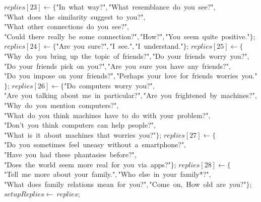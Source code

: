 \documentclass[a4paper,10pt]{article}
\begin{document}
\begin{algorithm}
\begin{algorithmic}[5]
  \STATE \(replies[23]\gets\{\)"{}In\ what\ way?"{}\(,\)"{}What\ resemblance\ do\ you\ see?"{}\(,\)"{}What\ does\ the\ similarity\ suggest\ to\ you?"{}\(,\)"{}What\ other\ connections\ do\ you\ see?"{}\(,\)"{}Could\ there\ really\ be\ some\ connection?"{}\(,\)"{}How?"{}\(,\)"{}You\ seem\ quite\ positive."{}\(\}\);
  \STATE \(replies[24]\gets\{\)"{}Are\ you\ sure?"{}\(,\)"{}I\ see."{}\(,\)"{}I\ understand."{}\(\}\);
  \STATE \(replies[25]\gets\{\)"{}Why\ do\ you\ bring\ up\ the\ topic\ of\ friends?"{}\(,\)"{}Do\ your\ friends\ worry\ you?"{}\(,\)"{}Do\ your\ friends\ pick\ on\ you?"{}\(,\)"{}Are\ you\ sure\ you\ have\ any\ friends?"{}\(,\)"{}Do\ you\ impose\ on\ your\ friends?"{}\(,\)"{}Perhaps\ your\ love\ for\ friends\ worries\ you."{}\(\}\);
  \STATE \(replies[26]\gets\{\)"{}Do\ computers\ worry\ you?"{}\(,\)"{}Are\ you\ talking\ about\ me\ in\ particular?"{}\(,\)"{}Are\ you\ frightened\ by\ machines?"{}\(,\)"{}Why\ do\ you\ mention\ computers?"{}\(,\)"{}What\ do\ you\ think\ machines\ have\ to\ do\ with\ your\ problem?"{}\(,\)"{}Don'{}t\ you\ think\ computers\ can\ help\ people?"{}\(,\)"{}What\ is\ it\ about\ machines\ that\ worries\ you?"{}\(\}\);
  \STATE \(replies[27]\gets\{\)"{}Do\ you\ sometimes\ feel\ uneasy\ without\ a\ smartphone?"{}\(,\)"{}Have\ you\ had\ these\ phantasies\ before?"{}\(,\)"{}Does\ the\ world\ seem\ more\ real\ for\ you\ via\ apps?"{}\(\}\);
  \STATE \(replies[28]\gets\{\)"{}Tell\ me\ more\ about\ your\ family."{}\(,\)"{}Who\ else\ in\ your\ family*?"{}\(,\)"{}What\ does\ family\ relations\ mean\ for\ you?"{}\(,\)"{}Come\ on,\ How\ old\ are\ you?"{}\(\}\);
  \STATE \(setupReplies\gets\ replies\);

\end{algorithmic}
\end{algorithm}
\end{document}
